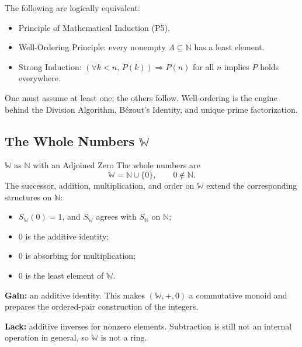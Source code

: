 \begin{remark*}
The following are logically equivalent:
\begin{itemize}
  \item Principle of Mathematical Induction (P5).
  \item Well-Ordering Principle: every nonempty $A \subseteq \mathbb{N}$
        has a least element.
  \item Strong Induction: $(\forall k < n,\, P(k)) \Rightarrow P(n)$
        for all $n$ implies $P$ holds everywhere.
\end{itemize}
One must assume at least one; the others follow.
Well-ordering is the engine behind the Division Algorithm, Bézout's Identity,
and unique prime factorization.
\end{remark*}

\subsection*{The Whole Numbers $\mathbb{W}$}

\begin{axiombox}{$\mathbb{W}$ as $\mathbb{N}$ with an Adjoined Zero}
The whole numbers are
\[
\mathbb{W}=\mathbb{N}\cup\{0\},
\qquad 0\notin\mathbb{N}.
\]
The successor, addition, multiplication, and order on $\mathbb{W}$ extend the
corresponding structures on $\mathbb{N}$:
\begin{itemize}
  \item $S_{\mathbb{W}}(0)=1$, and $S_{\mathbb{W}}$ agrees with
        $S_{\mathbb{N}}$ on $\mathbb{N}$;
  \item $0$ is the additive identity;
  \item $0$ is absorbing for multiplication;
  \item $0$ is the least element of $\mathbb{W}$.
\end{itemize}
\end{axiombox}

\begin{remark*}
\textbf{Gain:} an additive identity. This makes
$(\mathbb{W},+,0)$ a commutative monoid and prepares the ordered-pair
construction of the integers.

\textbf{Lack:} additive inverses for nonzero elements. Subtraction is still
not an internal operation in general, so $\mathbb{W}$ is not a ring.
\end{remark*}

